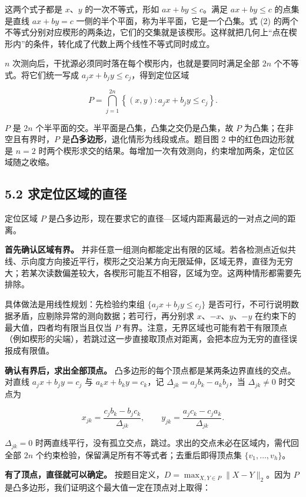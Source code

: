 \documentclass[UTF8,a4paper,zihao=-4,fontset=fandol]{ctexart}
\begin{document}
这两个式子都是 $x$、$y$ 的一次不等式，形如 $ax+by\le c$。满足 $ax+by\le c$ 的点集是直线 $ax+by=c$ 一侧的半个平面，称为半平面，它是一个凸集。式 (2) 的两个不等式分别对应楔形的两条边，它们的交集就是该楔形。这样就把几何上“点在楔形内”的条件，转化成了代数上两个线性不等式同时成立。

$n$ 次测向后，干扰源必须同时落在每个楔形内，也就是要同时满足全部 $2n$ 个不等式。将它们统一写成 $a_jx+b_jy\le c_j$，得到定位区域

\[
P=\bigcap_{j=1}^{2n}\left\{(x,y):a_jx+b_jy\le c_j\right\}. \tag{3}
\]

$P$ 是 $2n$ 个半平面的交。半平面是凸集，凸集之交仍是凸集，故 $P$ 为凸集；在非空且有界时，$P$ 是\textbf{凸多边形}，退化情形为线段或点。题目图 2 中的红色四边形就是 $n=2$ 时两个楔形求交的结果。每增加一次有效测向，约束增加两条，定位区域随之收缩。

\subsection*{5.2 求定位区域的直径}

定位区域 $P$ 是凸多边形，现在要求它的直径---区域内距离最远的一对点之间的距离。

\textbf{首先确认区域有界。} 并非任意一组测向都能定出有限的区域。若各检测点近似共线、示向度方向接近平行，楔形之交沿某方向无限延伸，区域无界，直径为无穷大；若某次读数偏差较大，各楔形可能互不相容，区域为空。这两种情形都需要先排除。

具体做法是用线性规划：先检验约束组 $\{a_jx+b_jy\le c_j\}$ 是否可行，不可行说明数据矛盾，应剔除异常的测向数据；若可行，再分别求 $x$、$-x$、$y$、$-y$ 在约束下的最大值，四者均有限当且仅当 $P$ 有界。注意，无界区域也可能有若干有限顶点（例如楔形的尖端），若跳过这一步直接取顶点对距离，会把本应为无穷的直径误报成有限值。

\textbf{确认有界后，求出全部顶点。} 凸多边形的每个顶点都是某两条边界直线的交点。对直线 $a_jx+b_jy=c_j$ 与 $a_kx+b_ky=c_k$，记 $\Delta_{jk}=a_jb_k-a_kb_j$，当 $\Delta_{jk}\ne0$ 时交点为

\[
x_{jk}=\frac{c_jb_k-b_jc_k}{\Delta_{jk}},\qquad
y_{jk}=\frac{a_jc_k-c_ja_k}{\Delta_{jk}}. \tag{4}
\]

$\Delta_{jk}=0$ 时两直线平行，没有孤立交点，跳过。求出的交点未必在区域内，需代回全部 $2n$ 个约束检验，保留满足所有不等式者；去重后即得顶点集 $\{v_1,\dots,v_h\}$。

\textbf{有了顶点，直径就可以确定。} 按题目定义，$D=\max_{X,Y\in P}\|X-Y\|_2$。因为 $P$ 是凸多边形，我们证明这个最大值一定在顶点对上取得：
\end{document}
